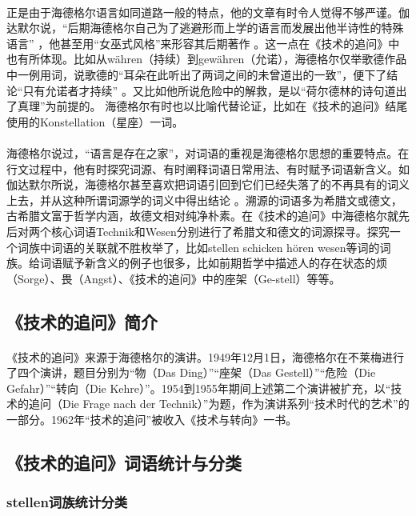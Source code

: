 \documentclass{article}
\begin{document}
		\paragraph{}
		正是由于海德格尔语言如同道路一般的特点，他的文章有时令人觉得不够严谨。伽达默尔说，“后期海德格尔自己为了逃避形而上学的语言而发展出他半诗性的特殊语言”
\cite{Text_Explain_DeFr}
，他甚至用“女巫式风格”来形容其后期著作
\cite[pg. 113]{Deonstr_DeFr}
。这一点在《技术的追问》中也有所体现。比如从währen（持续）到gewähren（允诺），海德格尔仅举歌德作品中一例用词，说歌德的“耳朵在此听出了两词之间的未曾道出的一致”，便下了结论“只有允诺者才持续”
。又比如他所说危险中的解救，是以“荷尔德林的诗句道出了真理”为前提的\cite{slct_Hei_Szx}。
海德格尔有时也以比喻代替论证，比如在《技术的追问》结尾使用的Konstellation（星座）一词。
		\paragraph{}
		海德格尔说过，“语言是存在之家”，对词语的重视是海德格尔思想的重要特点。在行文过程中，他有时探究词源、有时阐释词语日常用法、有时赋予词语新含义。如伽达默尔所说，海德格尔甚至喜欢把词语引回到它们已经失落了的不再具有的词义上去，并从这种所谓词源学的词义中得出结论
\cite{Deonstr_DeFr}。溯源的词语多为希腊文或德文，古希腊文富于哲学内涵，故德文相对纯净朴素。在《技术的追问》中海德格尔就先后对两个核心词语Technik和Wesen分别进行了希腊文和德文的词源探寻。探究一个词族中词语的关联就不胜枚举了，比如stellen schicken hören wesen等词的词族。给词语赋予新含义的例子也很多，比如前期哲学中描述人的存在状态的烦（Sorge）、畏（Angst）、《技术的追问》中的座架（Ge-stell）等等。
	\subsection{《技术的追问》简介}
		\paragraph{}
		《技术的追问》来源于海德格尔的演讲。1949年12月1日，海德格尔在不莱梅进行了四个演讲，题目分别为“物（Das Ding）”“座架（Das Gestell）”“危险（Die Gefahr）”“转向（Die Kehre）”。1954到1955年期间上述第二个演讲被扩充，以“技术的追问（Die Frage nach der Technik）”为题，作为演讲系列“技术时代的艺术”的一部分。1962年“技术的追问”被收入《技术与转向》一书。
	\subsection{《技术的追问》词语统计与分类}
		\subsubsection{stellen词族统计分类}
\end{document}
